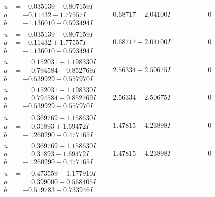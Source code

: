 \documentclass[1p]{elsarticle_modified}
\theoremstyle{definition}
\begin{document}
$$\begin{array}{c|c|c}
\begin{aligned}
u &= -0.035139 + 0.807159 I \\
a &= -0.11432 - 1.77557 I \\
b &= -1.136010 + 0.593494 I\end{aligned}
 & \phantom{-}0.68717 + 2.04100 I & \phantom{-0.000000 } 0 \\ \hline\begin{aligned}
u &= -0.035139 - 0.807159 I \\
a &= -0.11432 + 1.77557 I \\
b &= -1.136010 - 0.593494 I\end{aligned}
 & \phantom{-}0.68717 - 2.04100 I & \phantom{-0.000000 } 0 \\ \hline\begin{aligned}
u &= \phantom{-}0.152031 + 1.198330 I \\
a &= \phantom{-}0.794584 + 0.852769 I \\
b &= -0.539929 - 0.557970 I\end{aligned}
 & \phantom{-}2.56334 - 2.50675 I & \phantom{-0.000000 } 0 \\ \hline\begin{aligned}
u &= \phantom{-}0.152031 - 1.198330 I \\
a &= \phantom{-}0.794584 - 0.852769 I \\
b &= -0.539929 + 0.557970 I\end{aligned}
 & \phantom{-}2.56334 + 2.50675 I & \phantom{-0.000000 } 0 \\ \hline\begin{aligned}
u &= \phantom{-}0.369769 + 1.158630 I \\
a &= \phantom{-}0.31893 + 1.69472 I \\
b &= -1.260290 - 0.477165 I\end{aligned}
 & \phantom{-}1.47815 - 4.23898 I & \phantom{-0.000000 } 0 \\ \hline\begin{aligned}
u &= \phantom{-}0.369769 - 1.158630 I \\
a &= \phantom{-}0.31893 - 1.69472 I \\
b &= -1.260290 + 0.477165 I\end{aligned}
 & \phantom{-}1.47815 + 4.23898 I & \phantom{-0.000000 } 0 \\ \hline\begin{aligned}
u &= \phantom{-}0.473559 + 1.177910 I \\
a &= \phantom{-}0.399000 - 0.568405 I \\
b &= -0.519783 + 0.733946 I\end{aligned}

\end{array}$$
\end{document}
